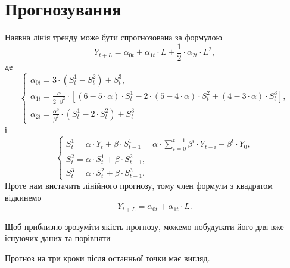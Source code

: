 \section{Прогнозування}

Наявна лінія тренду може бути спрогнозована за формулою
\begin{equation*}
  Y_{t + L} = \alpha_{0 t} + \alpha_{1 t} \cdot L + \frac{1}{2} \cdot \alpha_{2 t} \cdot L^2,
\end{equation*}
де
\begin{equation*}
  \begin{cases}
      \alpha_{0 t} = 3 \cdot \left( S_t^1 - S_t^2 \right) + S_t^3, \\
      \alpha_{1 t}
          = \frac{\alpha}{2 \cdot \beta^2} \cdot \left[
              \left( 6 - 5 \cdot \alpha \right) \cdot S_t^1
              - 2 \cdot \left( 5 - 4 \cdot \alpha \right) \cdot S_t^2
              + \left( 4 - 3 \cdot \alpha \right) \cdot S_t^3
            \right], \\
      \alpha_{2 t} = \frac{\alpha^2}{\beta^2} \cdot \left( S_t^1 - 2 \cdot S_t^2 \right) + S_t^3
  \end{cases}
\end{equation*}
і
\begin{equation*}
  \begin{cases}
      S_t^1 = \alpha \cdot Y_t + \beta \cdot S_{t-1}^1
            = \alpha \cdot \sum\limits_{i=0}^{t-1} \beta^i \cdot Y_{t-i} + \beta^t \cdot Y_0, \\
      S_t^2 = \alpha \cdot S_t^1 + \beta \cdot S_{t-1}^2, \\
      S_t^3 = \alpha \cdot S_t^2 + \beta \cdot S_{t-1}^3.
  \end{cases}
\end{equation*}
Проте нам вистачить лінійного прогнозу,
тому член формули з квадратом відкинемо
\begin{equation*}
  Y_{t + L} = \alpha_{0 t} + \alpha_{1 t} \cdot L.
\end{equation*}

Щоб приблизно зрозуміти якість прогнозу,
можемо побудувати його для вже існуючих даних та порівняти
\begin{center}
\end{center}
Прогноз на три кроки після останньої точки має вигляд.
\begin{center}
\end{center}

